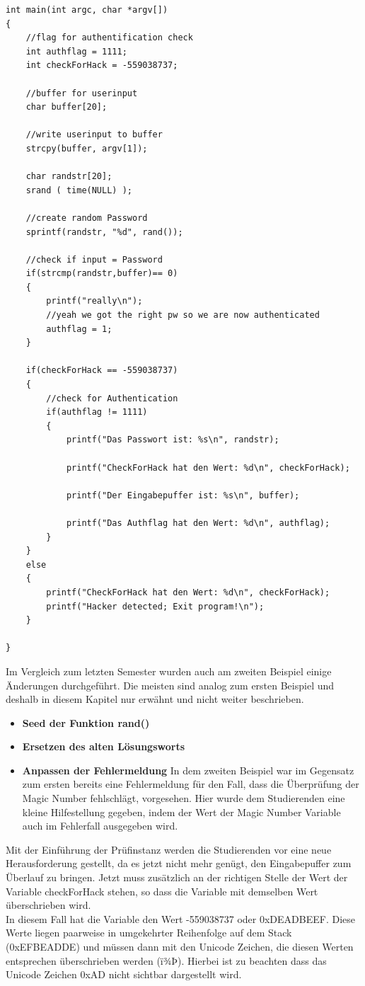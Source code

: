 \begin{lstlisting}
int main(int argc, char *argv[])
{
	//flag for authentification check
	int authflag = 1111;
	int checkForHack = -559038737;

	//buffer for userinput
	char buffer[20];

	//write userinput to buffer
	strcpy(buffer, argv[1]);

	char randstr[20];
	srand ( time(NULL) );
	
	//create random Password
	sprintf(randstr, "%d", rand());

	//check if input = Password
	if(strcmp(randstr,buffer)== 0)
	{
		printf("really\n");
		//yeah we got the right pw so we are now authenticated
		authflag = 1;
	}

	if(checkForHack == -559038737)
	{
		//check for Authentication
		if(authflag != 1111)
		{
			printf("Das Passwort ist: %s\n", randstr);
			
			printf("CheckForHack hat den Wert: %d\n", checkForHack);

			printf("Der Eingabepuffer ist: %s\n", buffer);

			printf("Das Authflag hat den Wert: %d\n", authflag);
		}
	}
	else
	{
		printf("CheckForHack hat den Wert: %d\n", checkForHack);
		printf("Hacker detected; Exit program!\n");
	}

}
\end{lstlisting}
Im Vergleich zum letzten Semester wurden auch am zweiten Beispiel einige Änderungen durchgeführt. Die meisten sind analog zum ersten Beispiel und deshalb in diesem Kapitel nur erwähnt und nicht weiter beschrieben.
\begin{itemize}
	\item \textbf{Seed der Funktion rand()}
	\item \textbf{Ersetzen des alten Lösungsworts}
	\item \textbf{Anpassen der Fehlermeldung} In dem zweiten Beispiel war im Gegensatz zum ersten bereits eine Fehlermeldung für den Fall, dass die Überprüfung der Magic Number fehlschlägt, vorgesehen. Hier wurde dem Studierenden eine kleine Hilfestellung gegeben, indem der Wert der Magic Number Variable auch im Fehlerfall ausgegeben wird.
\end{itemize}
Mit der Einführung der Prüfinstanz werden die Studierenden vor eine neue Herausforderung gestellt, da es jetzt nicht mehr genügt, den Eingabepuffer zum Überlauf zu bringen. Jetzt muss zusätzlich an der richtigen Stelle der Wert der Variable \glqq{}checkForHack\grqq{} stehen, so dass die Variable mit demselben Wert überschrieben wird.\\
In diesem Fall hat die Variable den Wert -559038737 oder 0xDEADBEEF. Diese Werte liegen paarweise in umgekehrter Reihenfolge auf dem Stack (0xEFBEADDE) und müssen dann mit den Unicode Zeichen, die diesen Werten entsprechen überschrieben werden (ï¾­Þ). Hierbei ist zu beachten dass das Unicode Zeichen 0xAD nicht sichtbar dargestellt wird.

